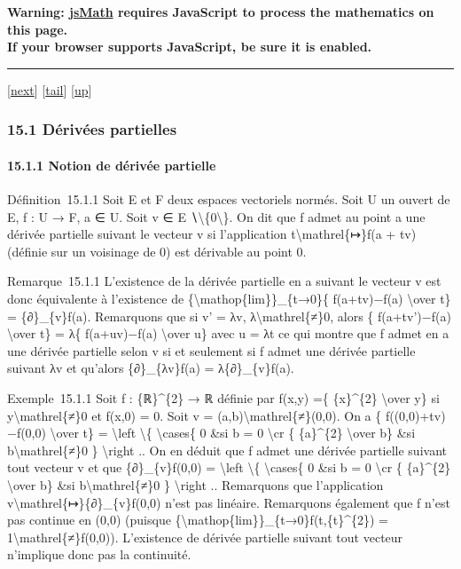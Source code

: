 \textbf{Warning: \href{http://www.math.union.edu/locate/jsMath}{jsMath}
requires JavaScript to process the mathematics on this page.\\ If your
browser supports JavaScript, be sure it is enabled.}

\begin{center}\rule{3in}{0.4pt}\end{center}

{[}\href{coursse83.html}{next}{]}
{[}\hyperref[tailcoursse82.html]{tail}{]}
{[}\href{coursch16.html\#coursse82.html}{up}{]}

\subsubsection{15.1 Dérivées partielles}

\paragraph{15.1.1 Notion de dérivée partielle}

Définition~15.1.1 Soit E et F deux espaces vectoriels normés. Soit U un
ouvert de E, f : U → F, a ∈ U. Soit v ∈ E
∖\textbackslash{}\{0\textbackslash{}\}. On dit que f admet au point a
une dérivée partielle suivant le vecteur v si l'application
t\textbackslash{}mathrel\{↦\}f(a + tv) (définie sur un voisinage de 0)
est dérivable au point 0.

Remarque~15.1.1 L'existence de la dérivée partielle en a suivant le
vecteur v est donc équivalente à l'existence de
\{\textbackslash{}mathop\{lim\}\}\_\{t→0\}\{ f(a+tv)−f(a)
\textbackslash{}over t\} = \{∂\}\_\{v\}f(a). Remarquons que si v' = λv,
λ\textbackslash{}mathrel\{≠\}0, alors \{ f(a+tv')−f(a)
\textbackslash{}over t\} = λ\{ f(a+uv)−f(a) \textbackslash{}over u\}
avec u = λt ce qui montre que f admet en a une dérivée partielle selon v
si et seulement si f admet une dérivée partielle suivant λv et qu'alors
\{∂\}\_\{λv\}f(a) = λ\{∂\}\_\{v\}f(a).

Exemple~15.1.1 Soit f : \{ℝ\}\^{}\{2\} → ℝ définie par f(x,y) =\{
\{x\}\^{}\{2\} \textbackslash{}over y\} si
y\textbackslash{}mathrel\{≠\}0 et f(x,0) = 0. Soit v =
(a,b)\textbackslash{}mathrel\{≠\}(0,0). On a \{ f((0,0)+tv)−f(0,0)
\textbackslash{}over t\} = \textbackslash{}left \textbackslash{}\{
\textbackslash{}cases\{ 0 \&si b = 0 \textbackslash{}cr \{
\{a\}\^{}\{2\} \textbackslash{}over b\} \&si
b\textbackslash{}mathrel\{≠\}0 \} \textbackslash{}right .. On en déduit
que f admet une dérivée partielle suivant tout vecteur v et que
\{∂\}\_\{v\}f(0,0) = \textbackslash{}left \textbackslash{}\{
\textbackslash{}cases\{ 0 \&si b = 0 \textbackslash{}cr \{
\{a\}\^{}\{2\} \textbackslash{}over b\} \&si
b\textbackslash{}mathrel\{≠\}0 \} \textbackslash{}right .. Remarquons
que l'application v\textbackslash{}mathrel\{↦\}\{∂\}\_\{v\}f(0,0) n'est
pas linéaire. Remarquons également que f n'est pas continue en (0,0)
(puisque \{\textbackslash{}mathop\{lim\}\}\_\{t→0\}f(t,\{t\}\^{}\{2\}) =
1\textbackslash{}mathrel\{≠\}f(0,0)). L'existence de dérivée partielle
suivant tout vecteur n'implique donc pas la continuité.

